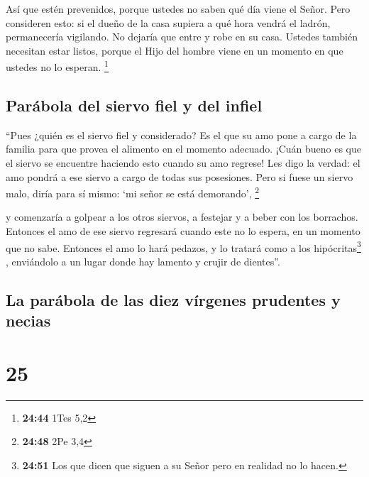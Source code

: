  Así que estén prevenidos, porque ustedes no saben qué
día viene el Señor.  Pero consideren esto: si el dueño de
la casa supiera a qué hora vendrá el ladrón, permanecería vigilando. No
dejaría que entre y robe en su casa.  Ustedes también
necesitan estar listos, porque el Hijo del hombre viene en un momento en
que ustedes no lo esperan. \footnote{\textbf{24:44} 1Tes 5,2}

\hypertarget{paruxe1bola-del-siervo-fiel-y-del-infiel}{%
\subsection{Parábola del siervo fiel y del
infiel}\label{paruxe1bola-del-siervo-fiel-y-del-infiel}}

 ``Pues ¿quién es el siervo fiel y considerado? Es el que
su amo pone a cargo de la familia para que provea el alimento en el
momento adecuado.  ¡Cuán bueno es que el siervo se
encuentre haciendo esto cuando su amo regrese!  Les digo
la verdad: el amo pondrá a ese siervo a cargo de todas sus posesiones.
 Pero si fuese un siervo malo, diría para sí mismo: `mi
señor se está demorando', \footnote{\textbf{24:48} 2Pe 3,4}

 y comenzaría a golpear a los otros siervos, a festejar y
a beber con los borrachos.  Entonces el amo de ese siervo
regresará cuando este no lo espera, en un momento que no sabe.
 Entonces el amo lo hará pedazos, y lo tratará como a los
hipócritas\footnote{\textbf{24:51} Los que dicen que siguen a su Señor
  pero en realidad no lo hacen.} , enviándolo a un lugar donde hay
lamento y crujir de dientes''.

\hypertarget{la-paruxe1bola-de-las-diez-vuxedrgenes-prudentes-y-necias}{%
\subsection{La parábola de las diez vírgenes prudentes y
necias}\label{la-paruxe1bola-de-las-diez-vuxedrgenes-prudentes-y-necias}}

\hypertarget{section-24}{%
\section{25}\label{section-24}}

